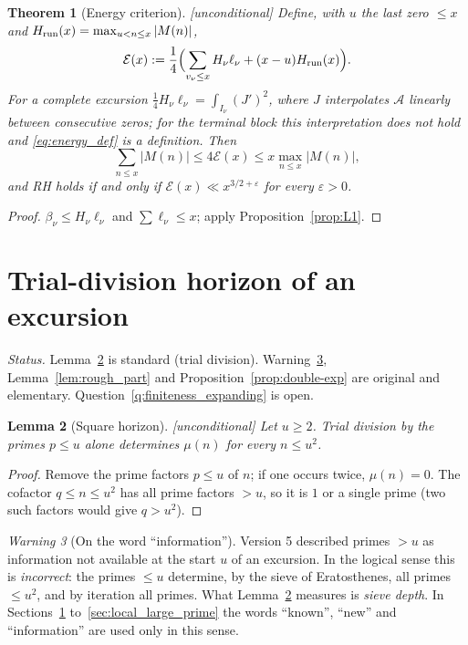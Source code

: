 \documentclass[11pt]{amsart}
\numberwithin{equation}{section}
\theoremstyle{plain}
\newtheorem{theorem}{Theorem}[section]
\newtheorem{lemma}[theorem]{Lemma}
\theoremstyle{definition}
\theoremstyle{remark}
\newtheorem{warning}[theorem]{Warning}
\newcommand{\Anet}{\mathcal{A}}
\newcommand{\eps}{\varepsilon}
\newcommand{\En}{\mathcal{E}}
\begin{document}
\begin{theorem}[Energy criterion]
\label{thm:energy}
\emph{[unconditional]} Define, with $u$ the last zero $\le x$ and
$H_{\rm run}(x)=\max_{u<n\le x}|M(n)|$,
\begin{equation}
\label{eq:energy_def}
  \En(x):=\frac14\Bigl(\sum_{v_\nu\le x}H_\nu\ell_\nu+(x-u)H_{\rm run}(x)\Bigr).
\end{equation}
For a complete excursion $\tfrac14H_\nu\ell_\nu=\int_{I_\nu}(J')^2$, where
$J$ interpolates $\Anet$ linearly between consecutive zeros; for the
terminal block this interpretation does not hold and \eqref{eq:energy_def} is
a definition. Then
\begin{equation}
\label{eq:energy_sandwich}
  \sum_{n\le x}|M(n)|\le4\En(x)\le x\max_{n\le x}|M(n)|,
\end{equation}
and RH holds if and only if $\En(x)\ll x^{3/2+\eps}$ for every $\eps>0$.
\end{theorem}

\begin{proof}
$\beta_\nu\le H_\nu\ell_\nu$ and $\sum\ell_\nu\le x$; apply
Proposition~\ref{prop:L1}.
\end{proof}

\section{Trial-division horizon of an excursion}
\label{sec:prime_horizon}

\noindent\emph{Status.} Lemma~\ref{lem:square-horizon} is standard (trial
division). Warning~\ref{warn:information_language},
Lemma~\ref{lem:rough_part} and Proposition~\ref{prop:double-exp} are
original and elementary. Question~\ref{q:finiteness_expanding} is open.

\begin{lemma}[Square horizon]
\label{lem:square-horizon}
\emph{[unconditional]} Let $u\ge2$. Trial division by the primes $p\le u$
alone determines $\mu(n)$ for every $n\le u^2$.
\end{lemma}

\begin{proof}
Remove the prime factors $p\le u$ of $n$; if one occurs twice, $\mu(n)=0$.
The cofactor $q\le n\le u^2$ has all prime factors $>u$, so it is $1$ or a
single prime (two such factors would give $q>u^2$).
\end{proof}

\begin{warning}[On the word ``information'']
\label{warn:information_language}
Version 5 described primes $>u$ as information not available at the start
$u$ of an excursion. In the logical sense this is \emph{incorrect}: the
primes $\le u$ determine, by the sieve of Eratosthenes, all primes $\le u^2$,
and by iteration all primes. What Lemma~\ref{lem:square-horizon} measures is
\emph{sieve depth}. In Sections~\ref{sec:prime_horizon}
to~\ref{sec:local_large_prime} the words ``known'', ``new'' and
``information'' are used only in this sense.
\end{warning}
\end{document}
